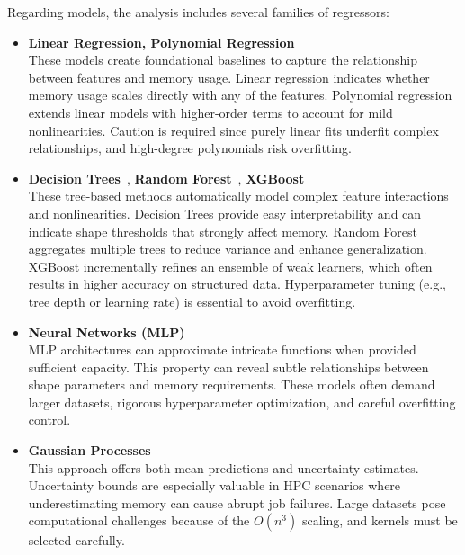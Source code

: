 Regarding models, the analysis includes several families of regressors:

\begin{itemize}
    \item \textbf{Linear Regression, Polynomial Regression}~\cite{hastie2009elements}\\
    These models create foundational baselines to capture the relationship between features and memory usage.
    Linear regression indicates whether memory usage scales directly with any of the features.
    Polynomial regression extends linear models with higher-order terms to account for mild nonlinearities.
    Caution is required since purely linear fits underfit complex relationships, and high-degree polynomials risk overfitting.

    \item \textbf{Decision Trees}~\cite{breiman1984classification}, \textbf{Random Forest}~\cite{breiman2001random}, \textbf{\ac{XGBoost}}~\cite{chen2016xgboost}\\
    These tree-based methods automatically model complex feature interactions and nonlinearities.
    Decision Trees provide easy interpretability and can indicate shape thresholds that strongly affect memory.
    Random Forest aggregates multiple trees to reduce variance and enhance generalization.
    \ac{XGBoost} incrementally refines an ensemble of weak learners, which often results in higher accuracy on structured data.
    Hyperparameter tuning (e.g., tree depth or learning rate) is essential to avoid overfitting. 

    \item \textbf{Neural Networks (\ac{MLP})}~\cite{rumelhart1986learning}\\
    \ac{MLP} architectures can approximate intricate functions when provided sufficient capacity.
    This property can reveal subtle relationships between shape parameters and memory requirements.
    These models often demand larger datasets, rigorous hyperparameter optimization, and careful overfitting control. 

    \item \textbf{Gaussian Processes}~\cite{rasmussen2006gaussian}\\
    This approach offers both mean predictions and uncertainty estimates.
    Uncertainty bounds are especially valuable in \ac{HPC} scenarios where underestimating memory can cause abrupt job failures.
    Large datasets pose computational challenges because of the \(O(n^3)\) scaling, and kernels must be selected carefully. 


\end{itemize}
